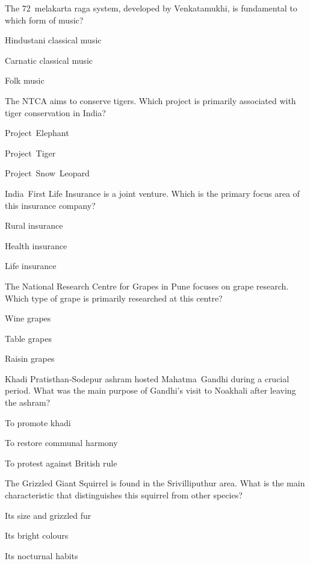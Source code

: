 \begin{enhancedmcq}{The 72 melakarta raga system, developed by Venkatamukhi, is fundamental to which form of music?}
\item Hindustani classical music
\item Carnatic classical music
\item Folk music

\end{enhancedmcq}
\begin{enhancedmcq}{The NTCA aims to conserve tigers. Which project is primarily associated with tiger conservation in India?}
\item Project Elephant
\item Project Tiger
\item Project Snow Leopard

\end{enhancedmcq}
\begin{enhancedmcq}{India First Life Insurance is a joint venture. Which is the primary focus area of this insurance company?}
\item Rural insurance
\item Health insurance
\item Life insurance

\end{enhancedmcq}
\begin{enhancedmcq}{The National Research Centre for Grapes in Pune focuses on grape research. Which type of grape is primarily researched at this centre?}
\item Wine grapes
\item Table grapes
\item Raisin grapes

\end{enhancedmcq}
\begin{enhancedmcq}{Khadi Pratisthan‑Sodepur ashram hosted Mahatma Gandhi during a crucial period. What was the main purpose of Gandhi's visit to Noakhali after leaving the ashram?}
\item To promote khadi
\item To restore communal harmony
\item To protest against British rule

\end{enhancedmcq}
\begin{enhancedmcq}{The Grizzled Giant Squirrel is found in the Srivilliputhur area. What is the main characteristic that distinguishes this squirrel from other species?}
\item Its size and grizzled fur
\item Its bright colours
\item Its nocturnal habits

\end{enhancedmcq}
